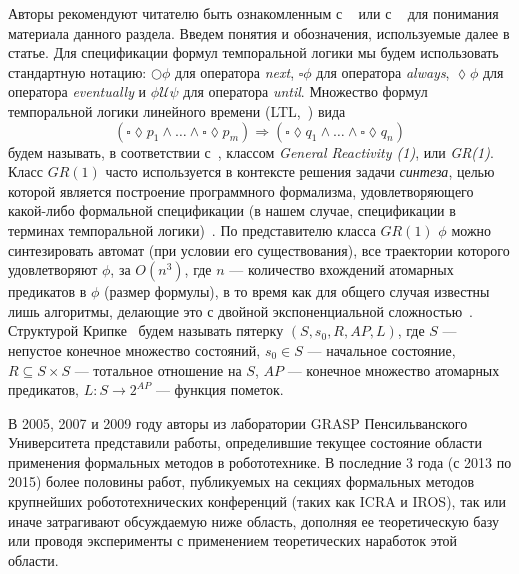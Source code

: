\documentclass[a4, 14pt]{article}
\begin{document}
Авторы рекомендуют читателю быть ознакомленным с ~\cite{karpov2010model} или с ~\cite{clarke1999model}
для понимания материала данного раздела. Введем понятия и обозначения, используемые далее 
в статье. Для спецификации формул темпоральной логики мы будем использовать стандартную нотацию: 
$\bigcirc\phi$ для оператора \textit{next}, $\square\phi$ для оператора \textit{always}, 
$\lozenge\phi$ для оператора \textit{eventually} и $\phi\mathcal{U}\psi$ для оператора 
\textit{until}. Множество формул темпоральной логики линейного 
времени (LTL,~\cite{emerson1990temporal}) вида
$$(\square\lozenge{p_1}\wedge\dots\wedge\square\lozenge{p_m})\Rightarrow(\square\lozenge{q_1}\wedge\dots\wedge\square\lozenge{q_n})$$
будем называть, в соответствии с~\cite{piterman2006synthesis}, классом \textit{General 
Reactivity (1)}, или \textit{GR(1)}. Класс $GR(1)$ часто используется в контексте решения задачи 
\textit{синтеза}, целью которой является построение программного формализма, удовлетворяющего 
какой-либо формальной спецификации (в нашем случае, спецификации в терминах темпоральной логики)~\cite{pnueli1989synthesis}.
По представителю класса $GR(1)$ $\phi$ можно синтезировать автомат (при условии его 
существования), все траектории которого удовлетворяют $\phi$, за $O(n^3)$, где 
$n$ --- количество вхождений атомарных предикатов в $\phi$ (размер формулы), в то 
время как для общего случая известны лишь алгоритмы, делающие это с двойной 
экспоненциальной сложностью~\cite{pnueli1989synthesis}. Структурой 
Крипке~\cite{kripke1963semantical} будем называть пятерку $(S, s_0, R, AP, L)$, где $S$ 
--- непустое конечное множество состояний, $s_0 \in S$ --- начальное состояние, 
$R \subseteq S\times{S}$ --- тотальное отношение на $S$, $AP$ --- конечное 
множество атомарных предикатов, $L: S \rightarrow 2^{AP}$ --- функция пометок.

В 2005, 2007 и 2009 году авторы из лаборатории GRASP Пенсильванского Университета 
представили работы, определившие текущее состояние области применения формальных 
методов в робототехнике. В последние 3 года (с 2013 по 2015) более половины 
работ, публикуемых на секциях формальных методов крупнейших робототехнических 
конференций (таких как ICRA и IROS), так или иначе затрагивают обсуждаемую 
ниже область, дополняя ее теоретическую базу или проводя эксперименты 
с применением теоретических наработок этой области.
\end{document}
